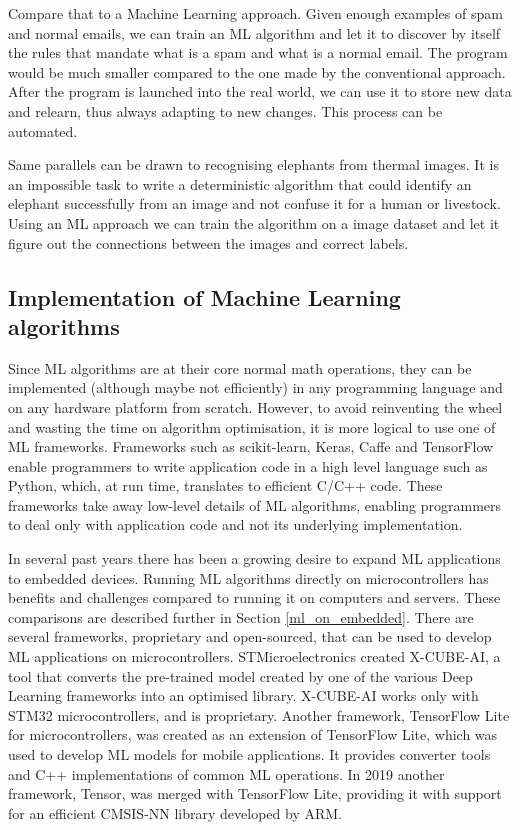 Compare that to a Machine Learning approach. 
Given enough examples of spam and normal emails, we can train an ML algorithm and let it to discover by itself the rules that mandate what is a spam and what is a normal email.
The program would be much smaller compared to the one made by the conventional approach. 
After the program is launched into the real world, we can use it to store new data and relearn, thus always adapting to new changes.
This process can be automated.

Same parallels can be drawn to recognising elephants from thermal images.
It is an impossible task to write a deterministic algorithm that could identify an elephant successfully from an image and not confuse it for a human or livestock. 
Using an ML approach we can train the algorithm on a image dataset and let it figure out the connections between the images and correct labels. 


\subsection{ Implementation of Machine Learning algorithms}

Since ML algorithms are at their core normal math operations, they can be implemented (although maybe not efficiently) in any programming language and on any hardware platform from scratch.
However, to avoid reinventing the wheel and wasting the time on algorithm optimisation, it is more logical to use one of ML frameworks.
Frameworks such as scikit-learn, Keras, Caffe and TensorFlow enable programmers to write application code in a high level language such as Python, which, at run time, translates to efficient C/C++ code. 
These frameworks take away low-level details of ML algorithms, enabling programmers to deal only with application code and not its underlying implementation.

In several past years there has been a growing desire to expand ML applications to embedded devices.
Running ML algorithms directly on microcontrollers has benefits and challenges compared to running it on computers and servers.
These comparisons are described further in Section \ref{ml_on_embedded}.
There are several frameworks, proprietary and open-sourced, that can be used to develop ML applications on microcontrollers.
STMicroelectronics created X-CUBE-AI, a tool that converts the pre-trained model created by one of the various Deep Learning frameworks into an optimised library. 
X-CUBE-AI works only with STM32 microcontrollers, and is proprietary.
Another framework, TensorFlow Lite for microcontrollers, was created as an extension of TensorFlow Lite, which was used to develop ML models for mobile applications.
It provides converter tools and C++ implementations of common ML operations.
In 2019 another framework, \si{\micro}Tensor, was merged with TensorFlow Lite, providing it with support for an efficient CMSIS-NN library developed by ARM.

